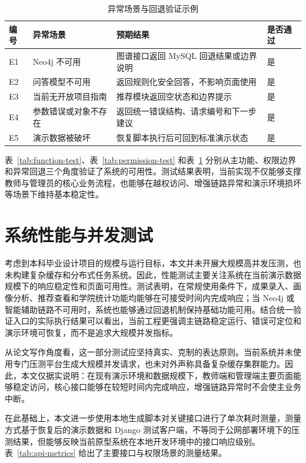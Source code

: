 \documentclass[12pt,a4paper]{ctexbook}
\begin{document}
\begin{table}[H]
  \centering
  \small
  \caption{异常场景与回退验证示例}
  \label{tab:fallback-test}
  \begin{tabular}{p{1.5cm}p{3.4cm}p{4.4cm}p{2.2cm}}
    \toprule
    编号 & 异常场景 & 预期结果 & 是否通过 \\
    \midrule
    E1 & Neo4j 不可用 & 图谱接口返回 MySQL 回退结果或边界说明 & 是 \\
    E2 & 问答模型不可用 & 返回规则化安全回答，不影响页面使用 & 是 \\
    E3 & 当前无开放项目指南 & 推荐模块返回空状态和边界提示 & 是 \\
    E4 & 参数错误或对象不存在 & 返回统一错误结构、请求编号和下一步建议 & 是 \\
    E5 & 演示数据被破坏 & 恢复脚本执行后可回到标准演示状态 & 是 \\
    \bottomrule
  \end{tabular}
\end{table}

表~\ref{tab:function-test}、表~\ref{tab:permission-test} 和表~\ref{tab:fallback-test} 分别从主功能、权限边界和异常回退三个角度验证了系统的可用性。测试结果表明，当前实现不仅能够支撑教师与管理员的核心业务流程，也能够在越权访问、增强链路异常和演示环境损坏等场景下维持基本稳定性。

\section{系统性能与并发测试}
考虑到本科毕业设计项目的规模与运行目标，本文并未开展大规模高并发压测，也未构建复杂缓存和分布式任务系统。因此，性能测试主要关注系统在当前演示数据规模下的响应稳定性和页面可用性。测试表明，在常规使用条件下，成果录入、画像分析、推荐查看和学院统计功能均能够在可接受时间内完成响应；当 Neo4j 或智能辅助链路不可用时，系统也能够通过回退机制保持基础功能可用。结合统一验证入口的实际执行结果可以看出，当前工程更强调主链路稳定运行、错误可定位和演示环境可恢复，而不是追求大规模并发指标。

从论文写作角度看，这一部分测试应坚持真实、克制的表达原则。当前系统并未使用专门压测平台生成大规模并发请求，也未对外声称具备复杂缓存集群能力。因此，本文仅据实说明：在现有演示环境和数据规模下，教师端和管理端主要页面能够稳定访问，核心接口能够在较短时间内完成响应，增强链路异常时不会使主业务中断。

在此基础上，本文进一步使用本地生成脚本对关键接口进行了单次耗时测量，测量方式基于恢复后的演示数据和 Django 测试客户端，不等同于公网部署环境下的压测结果，但能够反映当前原型系统在本地开发环境中的接口响应级别。表~\ref{tab:api-metrics} 给出了主要接口与权限场景的测量结果。
\end{document}
